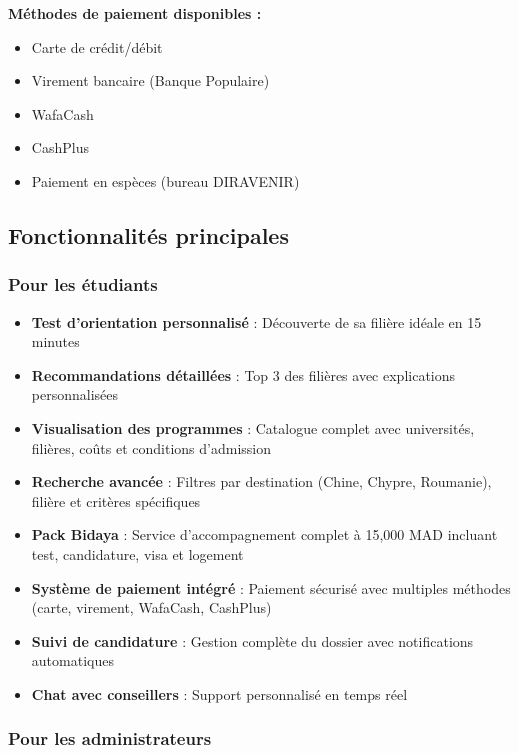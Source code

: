 \documentclass[12pt,a4paper]{report}
\begin{document}
\textbf{Méthodes de paiement disponibles :}
\begin{itemize}
    \item Carte de crédit/débit
    \item Virement bancaire (Banque Populaire)
    \item WafaCash
    \item CashPlus
    \item Paiement en espèces (bureau DIRAVENIR)
\end{itemize}

\subsection{Fonctionnalités principales}

\subsubsection{Pour les étudiants}

\begin{itemize}
    \item \textbf{Test d'orientation personnalisé} : Découverte de sa filière idéale en 15 minutes
    \item \textbf{Recommandations détaillées} : Top 3 des filières avec explications personnalisées
    \item \textbf{Visualisation des programmes} : Catalogue complet avec universités, filières, coûts et conditions d'admission
    \item \textbf{Recherche avancée} : Filtres par destination (Chine, Chypre, Roumanie), filière et critères spécifiques
    \item \textbf{Pack Bidaya} : Service d'accompagnement complet à 15,000 MAD incluant test, candidature, visa et logement
    \item \textbf{Système de paiement intégré} : Paiement sécurisé avec multiples méthodes (carte, virement, WafaCash, CashPlus)
    \item \textbf{Suivi de candidature} : Gestion complète du dossier avec notifications automatiques
    \item \textbf{Chat avec conseillers} : Support personnalisé en temps réel
\end{itemize}

\subsubsection{Pour les administrateurs}
\end{document}
